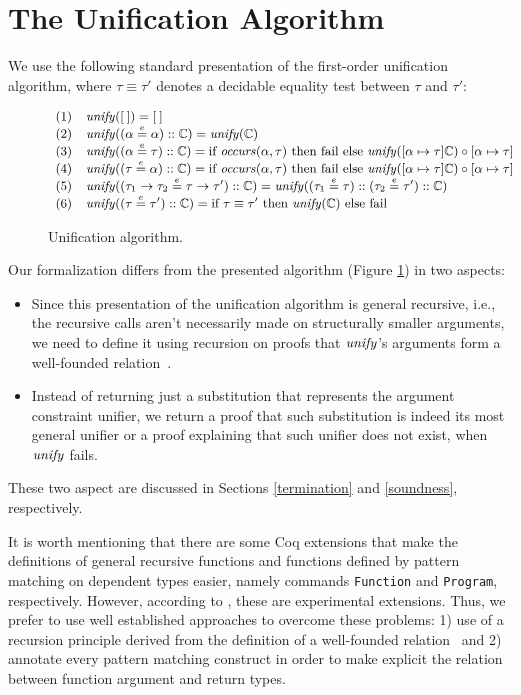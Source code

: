 \section{The Unification Algorithm}\label{algorithm-section}

We use the following standard presentation of the first-order
unification algorithm, where $\tau\equiv\tau'$ denotes a decidable
equality test between $\tau$ and $\tau'$:

\begin{figure}
\[
\small{
\begin{array}{ll}
(1) & \unify([\: ]) = [\: ]\\
(2) & \unify((\alpha \eeq \alpha) :: \mathbb{C}) = \unify(\mathbb{C})\\
(3) & \unify((\alpha \eeq\tau) :: \mathbb{C}) = 
      \If \occurs(\alpha,\tau) \Then \fail \Else \unify([\alpha\mapsto\tau]\mathbb{C})\circ [\alpha \mapsto \tau]\\
(4) & \unify((\tau \eeq\alpha) :: \mathbb{C}) = 
      \If \occurs(\alpha,\tau) \Then \fail \Else \unify([\alpha\mapsto\tau]\mathbb{C})\circ [\alpha \mapsto \tau]\\
(5) & \unify((\tau_1\to\tau_2 \eeq \tau\to\tau')::\mathbb{C}) = 
      \unify((\tau_1\eeq\tau)::(\tau_2\eeq\tau')::\mathbb{C}) \\
(6) & \unify((\tau \eeq \tau')::\mathbb{C}) = \If \tau\equiv\tau' \Then \unify(\mathbb{C}) \Else \fail 
\end{array}}
\]
\caption{Unification algorithm.}
\label{unifyalgorithm}
\end{figure}

Our formalization differs from the presented algorithm (Figure
\ref{unifyalgorithm}) in two aspects:
\begin{itemize}
     \item Since this presentation of the unification algorithm is
       general recursive, i.e., the recursive calls aren't necessarily
       made on structurally smaller arguments, we need to define it
       using recursion on proofs that $\text{\it unify\/}$'s arguments form a
       well-founded relation~.
    \item Instead of returning just a substitution that represents the
      argument constraint unifier, we return a proof that such
      substitution is indeed its most general unifier or a proof
      explaining that such unifier does not exist, when $\text{\it unify\/}$ fails.
\end{itemize}

These two aspect are discussed in Sections \ref{termination} and
\ref{soundness}, respectively.

It is worth mentioning that there are some Coq extensions that make
the definitions of general recursive functions and functions defined
by pattern matching on dependent types easier, namely commands
\texttt{Function} and \texttt{Program}, respectively. However,
according to \cite{coq}, these are experimental extensions. Thus, we
prefer to use well established approaches to overcome these problems:
1) use of a recursion principle derived from the definition of a
well-founded relation~ and 2) annotate every pattern
matching construct in order to make explicit the relation between
function argument and return types.
